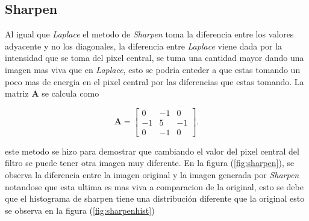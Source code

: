 \subsection{Sharpen}

 Al igual que \textit{Laplace} el metodo de \textit{Sharpen} toma la diferencia entre los valores adyacente y no los diagonales, la diferencia entre \textit{Laplace} viene dada por la intensidad que se toma del pixel central, se tuma una cantidad mayor dando una imagen mas viva que en \textit{Laplace}, esto se podria enteder a que estas tomando un poco mas de energia en el pixel central por las diferencias que estas tomando. La matriz \textbf{A} se calcula como
 
 \begin{equation}
\textbf{A}=\begin{bmatrix}
0 &-1 &0\\
-1 &5 &-1\\
0 &-1 &0
\end{bmatrix}.
\end{equation}

este metodo se hizo para demostrar que cambiando el valor del pixel central del filtro se puede tener otra imagen muy diferente. En la figura (\ref{fig:sharpen}), se observa la diferencia entre la imagen original y la imagen generada por \textit{Sharpen} notandose que esta ultima es mas viva a comparacion de la original, esto se debe que el histograma de sharpen tiene una distribución diferente que la original esto se observa en la figura (\ref{fig:sharpenhist})

